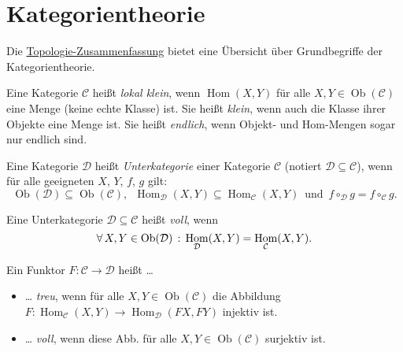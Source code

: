 \documentclass{cheat-sheet}
\DeclareMathOperator{\Hom}{Hom} %
\newcommand{\Cat}{\mathcal{C}} %
\newcommand{\Dat}{\mathcal{D}} %
\DeclareMathOperator{\Ob}{Ob} %
\begin{document}




\section{Kategorientheorie}

\begin{bem}
  Die \href{http://timbaumann.info/uni-spicker/topo.pdf}{Topologie-Zusammenfassung} bietet eine Übersicht über Grundbegriffe der Kategorientheorie.
\end{bem}

\begin{defn}
  Eine Kategorie $\Cat$ heißt \emph{lokal klein}, wenn $\Hom(X, Y)$ für alle $X, Y \in \Ob(\Cat)$ eine Menge (keine echte Klasse) ist.
  Sie heißt \emph{klein}, wenn auch die Klasse ihrer Objekte eine Menge ist.
  Sie heißt \emph{endlich}, wenn Objekt- und Hom-Mengen sogar nur endlich sind.
\end{defn}



\begin{defn}
  Eine Kategorie $\Dat$ heißt \emph{Unterkategorie} einer Kategorie $\Cat$ (notiert $\Dat \subseteq \Cat$), wenn für alle geeigneten $X$, $Y$, $f$, $g$ gilt:
  \[
    \Ob(\Dat) \subseteq \Ob(\Cat), \enspace
    \Hom_\Dat(X, Y) \subseteq \Hom_\Cat(X, Y) \enspace \text{und} \enspace
    f \circ_\Dat g = f \circ_\Cat g.
  \]
\end{defn}

\begin{defn}
  Eine Unterkategorie $\Dat \subseteq \Cat$ heißt \emph{voll}, wenn
  \[ \fa{X, Y \in \Ob(\Dat)} \Hom_\Dat(X, Y) = \Hom_\Cat(X, Y). \]
\end{defn}

\begin{defn}
  Ein Funktor $F : \Cat \to \Dat$ heißt \ldots
  \begin{itemize}
    \item \ldots{} \emph{treu}, wenn für alle $X, Y \in \Ob(\Cat)$ die Abbildung
    $F : \Hom_\Cat(X, Y) \to \Hom_\Dat(FX, FY)$
    injektiv ist.
    \item \ldots{} \emph{voll}, wenn diese Abb. für alle $X, Y \in \Ob(\Cat)$ surjektiv ist.
  \end{itemize}
\end{defn}
\end{document}
